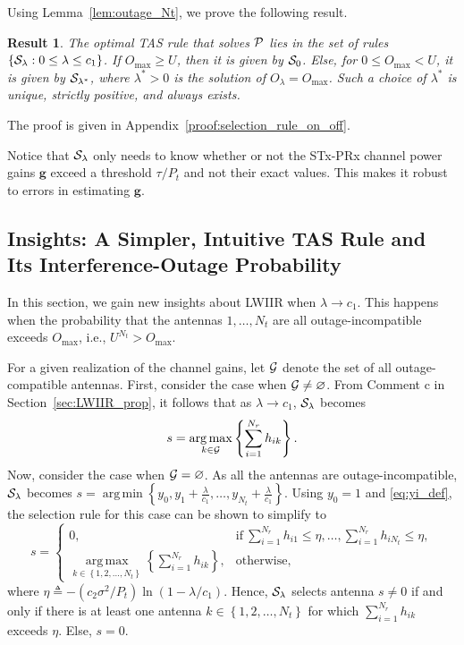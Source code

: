 \documentclass[12pt,draftcls,peerreview,onecolumn]{IEEEtran}
\newtheorem{result}{{\bf Result}}
\newcommand{\brac}[1]{\left({#1}\right)}
\newcommand{\set}[1]{\{#1\}}
\newcommand{\define}{\triangleq}
\newcommand{\tendsto}{\to}
\newcommand{\ie}{{i.e.}}
\newcommand{\prob}[1]{\text{Pr}\brac{#1}}
\DeclareMathOperator*{\argmin}{arg\,min}
\DeclareMathOperator*{\argmax}{arg\,max}
\newcommand{\lam}{\lambda}
\newcommand{\lamstar}{\lam^{*}}
\newcommand{\goodset}{\cal{G}}
\newcommand{\Nt}{{N_t}}
\newcommand{\Nr}{{N_r}}
\newcommand{\Pt}{{P_t}}
\newcommand{\such}{h}
\newcommand{\puch}{g}
\newcommand{\hk}[1]{{\such_{#1}}}
\newcommand{\gk}[1]{{\puch_{#1}}}
\newcommand{\g}{\mathbf{\puch}}
\newcommand{\noisevar}{\sigma^2}
\newcommand{\outmax}{O_{\text{max}}}
\newcommand{\itau}{\tau}
\newcommand{\cone}{c_{1}}
\newcommand{\ctwo}{c_{2}}
\newcommand{\out}{O}
\newcommand{\taubypt}{\frac{\itau}{\Pt}}
\newcommand{\gkgrtaubypt}[1]{{\gk{#1}}>\taubypt}
\newcommand{\lambym}{\frac{\lam}{\cone}}
\newcommand{\yk}[1]{y_{#1}}
\newcommand{\al}{\ctwo}
\newcommand{\un}{U}
\newcommand{\antopts}{\left\{1,2,\ldots,\Nt\right\}}
\newcommand{\igammainline}{{- \left( {\al\noisevar}/{\Pt}\right)  \ln\left({1-\lam/\cone }\right) }}
\newcommand{\optproblem}{{\cal P}}
\newcommand{\caluncons}{{\cal S_{\text{0}}}}
\newcommand{\callamrule}{{\cal S_{{\lam}}}}
\newcommand{\outlam}{\out_{\lam}}
\newcommand{\callamstarrule}{\cal S_{\lam^{*}}}
\newcommand{\nullset}{\varnothing}
\newcommand{\sumnr}{\sum_{i=1}^{\Nr}}
\begin{document}
Using Lemma~\ref{lem:outage_Nt}, we prove the following result. 
%
\begin{result}
\label{thm:selection_rule_on_off}
The optimal TAS rule that solves $\optproblem$ lies in the set of rules $\set{\callamrule:0\leq\lam\leq\cone}$. If $\outmax\geq\un$, then it is given by $\caluncons$. Else, for $0\leq\outmax<\un$, it is given by $\callamstarrule$, where $\lamstar>0$  is the solution of $\outlam=\outmax$. Such a choice of $\lamstar$ is unique, strictly positive, and always exists. 
\end{result}
%                
\begin{IEEEproof}
   The proof is given in Appendix~\ref{proof:selection_rule_on_off}.
\end{IEEEproof}
%

Notice that $\callamrule$ only needs to know whether or not the STx-PRx channel power gains $\g$ exceed a threshold $\tau/\Pt$ and not their exact values. This makes it robust to errors in estimating $\g$. 

\subsection{Insights: A Simpler, Intuitive  TAS Rule and Its Interference-Outage Probability}
In this section, we gain new insights about LWIIR when $\lam \tendsto \cone$. This happens when the probability that the antennas $1,\ldots,\Nt$ are all outage-incompatible exceeds $\outmax$, \ie, $\un^{\Nt}>\outmax$.    %
%

\newcommand{\gammath}{\eta}
For a given realization of the channel gains, let $\goodset$ denote the set of all outage-compatible antennas. First, consider the case when $\goodset\neq\nullset$. From Comment c in Section~\ref{sec:LWIIR_prop}, it follows that as $\lam \tendsto \cone$, $\callamrule$ becomes 
\begin{equation}
\label{eq:hp_rule_G_not_empty}
s = \argmax_{k\in\goodset}\left\lbrace \sumnr \hk{ik}\right\rbrace. 
\end{equation}
Now, consider the case when $\goodset= \nullset$. As all the antennas are outage-incompatible, $\callamrule$ becomes $s = \argmin\left\lbrace  \yk{0},\yk{1}+\lambym,\ldots,\yk{\Nt}+\lambym \right\rbrace$. Using $\yk{0}=1$ and \eqref{eq:yi_def}, the selection rule for this case can be shown to simplify to  
\begin{equation}
\label{eq:hp_rule_G_empty}
s = \left\{
\begin{array}{ll}
0 , & \text{if}~\sumnr\hk{i1}\leq\gammath,\ldots, \sumnr\hk{i\Nt}\leq\gammath, \\
\argmax\limits_{k\in\antopts}\left\lbrace \sumnr\hk{ik}\right\rbrace , &\text{otherwise},
\end{array}\right.
\end{equation}
where $\gammath\define\igammainline$. Hence, $\callamrule$ selects antenna $s\neq0$ if and only if there is at least one antenna $k\in\antopts$ for which $\sumnr \hk{ik}$ exceeds $\gammath$. Else, $s=0$. 
\end{document}
